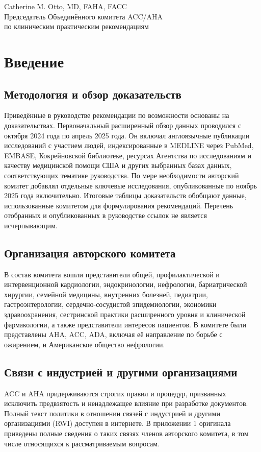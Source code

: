 \documentclass[11pt,a4paper]{article}
\begin{document}
\begin{flushright}
Catherine M. Otto, MD, FAHA, FACC\\
Председатель Объединённого комитета ACC/AHA\\
по клиническим практическим рекомендациям
\end{flushright}

\section{Введение}
\subsection{Методология и обзор доказательств}
Приведённые в руководстве рекомендации по возможности основаны на доказательствах. Первоначальный расширенный обзор данных проводился с октября 2024 года по апрель 2025 года. Он включал англоязычные публикации исследований с участием людей, индексированные в MEDLINE через PubMed, EMBASE, Кокрейновской библиотеке, ресурсах Агентства по исследованиям и качеству медицинской помощи США и других выбранных базах данных, соответствующих тематике руководства. По мере необходимости авторский комитет добавлял отдельные ключевые исследования, опубликованные по ноябрь 2025 года включительно. Итоговые таблицы доказательств обобщают данные, использованные комитетом для формулирования рекомендаций. Перечень отобранных и опубликованных в руководстве ссылок не является исчерпывающим.

\subsection{Организация авторского комитета}
В состав комитета вошли представители общей, профилактической и интервенционной кардиологии, эндокринологии, нефрологии, бариатрической хирургии, семейной медицины, внутренних болезней, педиатрии, гастроэнтерологии, сердечно-сосудистой эпидемиологии, экономики здравоохранения, сестринской практики расширенного уровня и клинической фармакологии, а также представители интересов пациентов. В комитете были представлены AHA, ACC, ADA, включая её направление по борьбе с ожирением, и Американское общество нефрологии.

\subsection{Связи с индустрией и другими организациями}
ACC и AHA придерживаются строгих правил и процедур, призванных исключить предвзятость и ненадлежащее влияние при разработке документов. Полный текст политики в отношении связей с индустрией и другими организациями (RWI) доступен в интернете. В приложении 1 оригинала приведены полные сведения о таких связях членов авторского комитета, в том числе относящихся к рассматриваемым вопросам.
\end{document}
